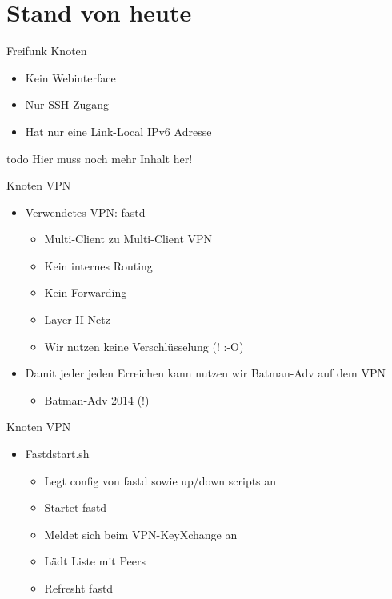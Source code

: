 \section{Stand von heute}

\begin{frame}{Freifunk Knoten}
    \begin{itemize}
        \item Kein Webinterface
        \item Nur SSH Zugang
        \item Hat nur eine Link-Local IPv6 Adresse
    \end{itemize}

    todo Hier muss noch mehr Inhalt her!
\end{frame}

\begin{frame}{Knoten VPN}
    \begin{itemize}
        \item Verwendetes VPN: fastd
        \begin{itemize}
            \item Multi-Client zu Multi-Client VPN
            \item Kein internes Routing
            \item Kein Forwarding
            \item Layer-II Netz
            \item Wir nutzen keine Verschlüsselung (! :-O)
        \end{itemize}
        \item Damit jeder jeden Erreichen kann nutzen wir Batman-Adv auf dem VPN
        \begin{itemize}
            \item Batman-Adv 2014 (!)
        \end{itemize}
    \end{itemize}
\end{frame}

\begin{frame}{Knoten VPN}
    \begin{itemize}
        \item Fastdstart.sh
        \begin{itemize}
            \item Legt config von fastd sowie up/down scripts an
            \item Startet fastd
            \item Meldet sich beim VPN-KeyXchange an
            \item Lädt Liste mit Peers
            \item Refresht fastd
        \end{itemize}
    \end{itemize}
\end{frame}

